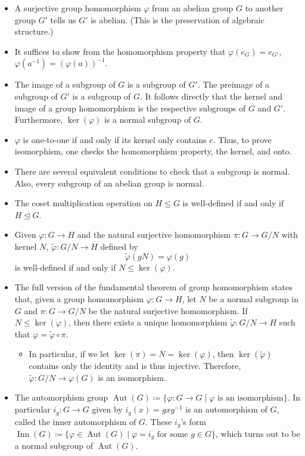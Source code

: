 \documentclass{article}
\newcommand{\aut}{\operatorname{Aut}}
\newcommand{\inn}{\operatorname{Inn}}
\renewcommand{\phi}{\varphi}
\begin{document}
\begin{itemize}
    \item A surjective group homomorphism $\phi$ from an abelian group $G$ to another group $G'$ tells us $G'$ is abelian. (This is the preservation of algebraic structure.)
    \item It suffices to show from the homomorphism property that $\phi(e_G) = e_{G'}$, $\phi(a^{-1}) = (\phi(a))^{-1}$.
    \item The image of a subgroup of $G$ is a subgroup of $G'$. The preimage of a subgroup of $G'$ is a subgroup of $G$. It follows directly that the kernel and image of a group homomorphism is the respective subgroups of $G$ and $G'$. Furthermore, $\ker(\phi)$ is a normal subgroup of $G$.
    \item $\phi$ is one-to-one if and only if its kernel only contains $e$. Thus, to prove isomorphism, one checks the homomorphism property, the kernel, and onto.
    \item There are several equivalent conditions to check that a subgroup is normal. Also, every subgroup of an abelian group is normal.
    \item The coset multiplication operation on $H \leq G$ is well-defined if and only if $H \trianglelefteq G$.
    \item Given $\phi: G \to H$ and the natural surjective homomorphism $\pi: G \to G/N$ with kernel $N$, $\tilde{\phi}: G/N \to H$ defined by $$\tilde{\phi}(gN) = \phi(g)$$ is well-defined if and only if $N \leq \ker(\phi)$.
    \item The full version of the fundamental theorem of group homomorphism states that, given a group homomorphism $\phi: G \to H$, let $N$ be a normal subgroup in $G$ and $\pi: G \to G/N$ be the natural surjective homomorphism. If $N \leq \ker(\phi)$, then there exists a unique homomorphism $\tilde{\phi}: G/N \to H$ such that $\phi = \tilde{\phi} \circ \pi$.
    \begin{itemize}
        \item In particular, if we let $\ker(\pi) = N = \ker(\phi)$, then $\ker(\tilde{\phi})$ contains only the identity and is thus injective. Therefore, $\tilde{\phi}: G/N \to \phi(G)$ is an isomorphism.
    \end{itemize}
    \item The automorphism group $\aut(G) \coloneqq \{\phi: G \to G \mid \phi \text{ is an isomorphism}\}$. In particular $i_g: G \to G$ given by $i_g(x) = g x g^{-1}$ is an automorphism of $G$, called the inner automorphism of $G$. These $i_g$'s form $\inn(G) \coloneqq \{\phi \in \aut(G) \mid \phi = i_g \text{ for some } g \in G\}$, which turns out to be a normal subgroup of $\aut(G)$.

\end{itemize}
\end{document}
